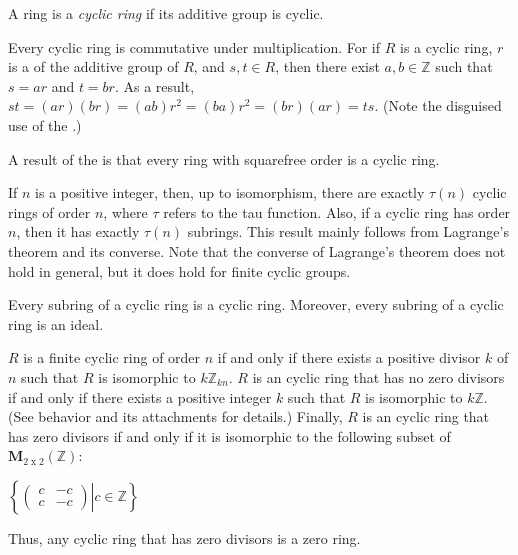 \documentclass[12pt]{article}
\begin{document}
A ring is a {\sl cyclic ring \/} if its additive group is cyclic.

Every cyclic ring is commutative under multiplication.  For if $R$ is a cyclic ring, $r$ is a  of the additive group of $R$, and $s,t \in R$, then there exist $a,b \in {\mathbb Z}$ such that $s=ar$ and $t=br$.  As a result, $st=(ar)(br)=(ab)r^2=(ba)r^2=(br)(ar)=ts.$  (Note the disguised use of the .)

A result of the  is that every ring with squarefree order is a cyclic ring.

If $n$ is a positive integer, then, up to isomorphism, there are exactly $\tau (n)$ cyclic rings of order $n$, where $\tau$ refers to the tau function.  Also, if a cyclic ring has order $n$, then it has exactly $\tau (n)$ subrings.  This result mainly follows from Lagrange's theorem and its converse.  Note that the converse of Lagrange's theorem does not hold in general, but it does hold for finite cyclic groups.

Every subring of a cyclic ring is a cyclic ring.  Moreover, every subring of a cyclic ring is an ideal.

$R$ is a finite cyclic ring of order $n$ if and only if there exists a positive divisor $k$ of $n$ such that $R$ is isomorphic to $k{\mathbb Z}_{kn}$.  $R$ is an  cyclic ring that has no zero divisors if and only if there exists a positive integer $k$ such that $R$ is isomorphic to $k{\mathbb Z}$.  (See behavior and its attachments for details.)  Finally, $R$ is an  cyclic ring that has zero divisors if and only if it is isomorphic to the following subset of ${\mathbf M}_{2\operatorname{x}2}({\mathbb Z})$:

\begin{center}
$\left\{ \left. \left( \begin{array}{cc}
c & -c \\
c & -c \end{array} \right) \right| c \in {\mathbb Z} \right\}$
\end{center}

Thus, any  cyclic ring that has zero divisors is a zero ring.
\end{document}
